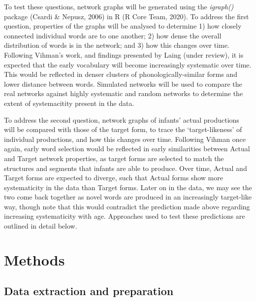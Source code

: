 \documentclass[
  man]{apa6}
\begin{document}
To test these questions, network graphs will be generated using the \emph{igraph()} package (Csardi \& Nepusz, 2006) in R (R Core Team, 2020). To address the first question, properties of the graphs will be analysed to determine 1) how closely connected individual words are to one another; 2) how dense the overall distribution of words is in the network; and 3) how this changes over time. Following Vihman's work, and findings presented by Laing (under review), it is expected that the early vocabulary will become increasingly systematic over time. This would be reflected in denser clusters of phonologically-similar forms and lower distance between words. Simulated networks will be used to compare the real networks against highly systematic and random networks to determine the extent of systemacitity present in the data.

To address the second question, network graphs of infants' actual productions will be compared with those of the target form, to trace the `target-likeness' of individual productions, and how this changes over time. Following Vihman once again, early word selection would be reflected in early similarities between Actual and Target network properties, as target forms are selected to match the structures and segments that infants are able to produce. Over time, Actual and Target forms are expected to diverge, such that Actual forms show more systematicity in the data than Target forms. Later on in the data, we may see the two come back together as novel words are produced in an increasingly target-like way, though note that this would contradict the prediction made above regarding increasing systematicity with age. Approaches used to test these predictions are outlined in detail below.

\hypertarget{methods}{%
\section{Methods}\label{methods}}

\hypertarget{data-extraction-and-preparation}{%
\subsection{Data extraction and preparation}\label{data-extraction-and-preparation}}
\end{document}
